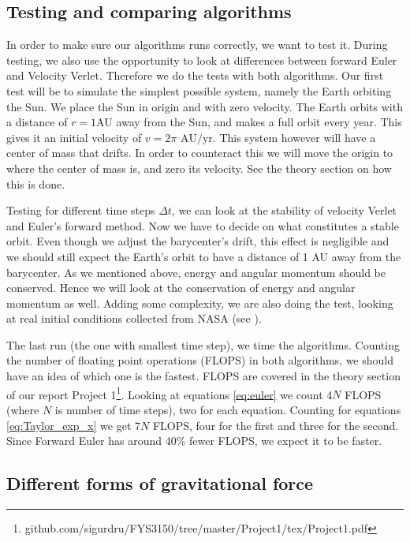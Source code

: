 \documentclass[reprint, english,notitlepage,nofootinbib]{revtex4-1}  %
\begin{document}
\subsection{Testing and comparing algorithms}

In order to make sure our algorithms runs correctly, we want to test it. During testing, we also use the opportunity to look at differences between forward Euler and Velocity Verlet. Therefore we do the tests with both algorithms. Our first test will be to simulate the simplest possible system, namely the Earth orbiting the Sun. We place the Sun in origin and with zero velocity. The Earth orbits with a distance of $r=1$AU away from the Sun, and makes a full orbit every year. This gives it an initial velocity of $v = 2\pi \text{ AU}/\text{yr}.$ This system however will have a center of mass that drifts. In order to counteract this we will move the origin to where the center of mass is, and zero its velocity. See the theory section on how this is done.

Testing for different time steps $\Delta t$, we can look at the stability of velocity Verlet and Euler's forward method. Now we have to decide on what constitutes a stable orbit. Even though we adjust the barycenter's drift, this effect is negligible and we should still expect the Earth's orbit to have a distance of 1 AU away from the barycenter. As we mentioned above, energy and angular momentum should be conserved. Hence we will look at the conservation of energy and angular momentum as well. Adding some complexity, we are also doing the test, looking at real initial conditions collected from NASA (see \citep{NASA}).

The last run (the one with smallest time step), we time the algorithms. Counting the number of floating point operations (FLOPS) in both algorithms, we should have an idea of which one is the fastest. FLOPS are covered in the theory section of our report Project 1\footnote{github.com/sigurdru/FYS3150/tree/master/Project1/tex/Project1.pdf}. Looking at equations \eqref{eq:euler} we count 4$N$ FLOPS (where $N$ is number of time steps), two for each equation. Counting for equations \eqref{eq:Taylor_exp_x} we get 7$N$ FLOPS, four for the first and three for the second. Since Forward Euler has around 40\% fewer FLOPS, we expect it to be faster.

\subsection{Different forms of gravitational force}
\end{document}
